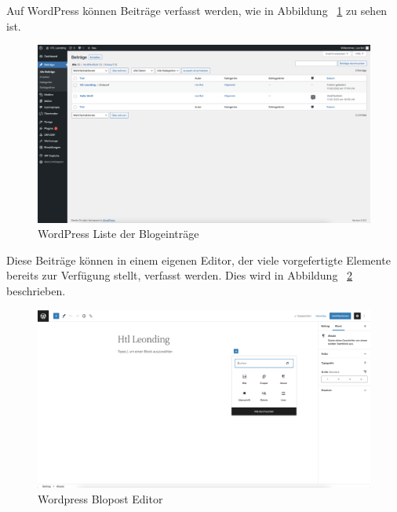 Auf WordPress können Beiträge verfasst werden, wie in Abbildung ~\ref{fig:impl:bloglist} zu sehen ist.

\begin{figure}[hbt!]
    \centering
    \includegraphics[scale=0.2]{pics/bloglist}
    \caption{WordPress Liste der Blogeinträge}
    \label{fig:impl:bloglist}
\end{figure}


Diese Beiträge können in einem eigenen Editor, der viele vorgefertigte Elemente bereits zur Verfügung stellt, verfasst werden.
Dies wird in Abbildung ~\ref{fig:impl:blogpost} beschrieben.

\begin{figure}[hbt!]
    \centering
    \includegraphics[scale=0.2]{pics/blogpost}
    \caption{Wordpress Blopost Editor}
    \label{fig:impl:blogpost}
\end{figure}
